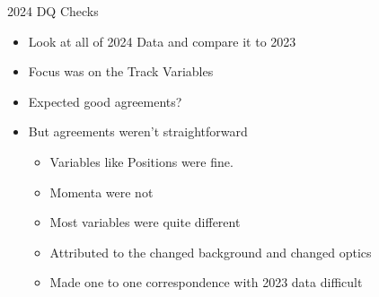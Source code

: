 \begin{frame}{2024 DQ Checks}
    \begin{itemize}
        \item Look at all of 2024 Data and compare it to 2023
        \item Focus was on the Track Variables
        \item Expected good agreements?
        \item But agreements weren't straightforward
        \begin{itemize}
            \item Variables like Positions were fine.
            \item Momenta were not
            \item Most variables were quite different
            \item Attributed to the changed background and changed optics
            \item Made one to one correspondence with 2023 data difficult
        \end{itemize}
    \end{itemize}
\end{frame}

